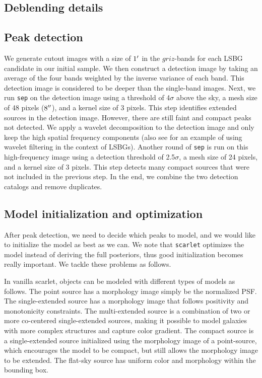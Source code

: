 \documentclass[twocolumn,astrosymb,twocolappendix]{aastex631}
\newcommand{\code}[1]{\texttt{#1}}
\begin{document}
\begin{CJK*}{UTF8}{gbsn}

\section{Deblending details}\label{ap:deblending}

\subsection{Peak detection}\label{sec:peak}
We generate cutout images with a size of $1\mbox{$^\prime$}$ in the $griz$-bands for each LSBG candidate in our initial sample. We then construct a detection image by taking an average of the four bands weighted by the inverse variance of each band. This detection image is considered to be deeper than the single-band images. 
Next, we run \code{sep} on the detection image using a threshold of 4$\sigma$ above the sky, a mesh size of 48 pixels ($8\mbox{$^{\prime\prime}$}$), and a kernel size of 3 pixels. This step identifies extended sources in the detection image. However, there are still faint and compact peaks not detected. We apply a wavelet decomposition to the detection image \citep{Starck2015} and only keep the high spatial frequency components (also see \citealt{Zaritsky2019} for an example of using wavelet filtering in the context of LSBGs). Another round of \code{sep} is run on this high-frequency image using a detection threshold of 2.5$\sigma$, a mesh size of 24 pixels, and a kernel size of 3 pixels. This step detects many compact sources that were not included in the previous step. In the end, we combine the two detection catalogs and remove duplicates. 

\subsection{Model initialization and optimization}

After peak detection, we need to decide which peaks to model, and we would like to initialize the model as best as we can. We note that \code{scarlet} optimizes the model instead of deriving the full posteriors, thus good initialization becomes really important. We tackle these problems as follows. 


In vanilla scarlet, objects can be modeled with different types of models as follows. The point source has a morphology image simply be the normalized PSF. The single-extended source has a morphology image that follows positivity and monotonicity constraints. The multi-extended source is a combination of two or more co-centered single-extended sources, making it possible to model galaxies with more complex structures and capture color gradient. The compact source is a single-extended source initialized using the morphology image of a point-source, which encourages the model to be compact, but still allows the morphology image to be extended. The flat-sky source has uniform color and morphology within the bounding box.



\end{CJK*}
\end{document}
